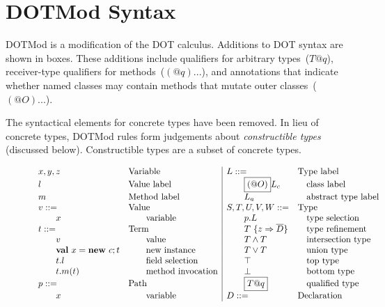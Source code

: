 \section{DOTMod Syntax}

DOTMod is a modification of the DOT calculus.
Additions to DOT syntax are shown in boxes.
These additions include qualifiers for arbitrary types~(\mbox{$T@q$}),
receiver-type qualifiers for methods~(\mbox{$(@q)...$}),
and annotations that indicate whether named classes may contain methods
that mutate outer classes~(\mbox{$(@O)...$}).

The syntactical elements for concrete types have been removed.
In lieu of concrete types, DOTMod rules form judgements about
{\em constructible types} (discussed below). Constructible types
are a subset of concrete types.

\begin{figure}[htbp]
	\begin{equation*}
	\begin{array}{ll|ll}
		x,y,z & \text{Variable} &
			L::= & \text{Type label} \\
		l & \text{Value label} &
			\qquad \boxed{(@O)} L_c & \quad \text{class label} \\
		m & \text{Method label} &
			\qquad L_a & \quad \text{abstract type label} \\
		v::= & \text{Value} &
			S,T,U,V,W::= & \text{Type} \\
		\qquad x & \qquad \text{variable} &
			\qquad p.L & \quad \text{type selection} \\
		t::= & \text{Term} &
			\qquad T\ \{ z \Rightarrow \overline{D} \} & \quad \text{type refinement} \\
		\qquad v & \qquad \text{value} &
			\qquad T \land T & \quad \text{intersection type} \\
		\qquad {\bf val}\ x = {\bf new}\ c; t & \qquad \text{new instance} &
			\qquad T \lor T & \quad \text{union type} \\
		\qquad t.l & \qquad \text{field selection} & \qquad \top & \quad \text{top type} \\
		\qquad t.m(t) & \qquad \text{method invocation} &
			\qquad \bot & \quad \text{bottom type} \\
		p::= & \text{Path} &
			\qquad \boxed{T@q} & \quad \text{qualified type} \\
		\qquad x & \qquad \text{variable} &
			D::= & \text{Declaration} \\

\end{array}
\end{equation*}
\end{figure}
